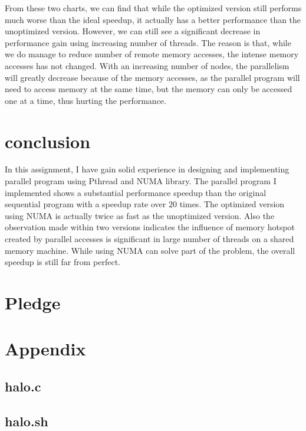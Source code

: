 \documentclass{cs4444}
\begin{document}
From these two charts, we can find that while the optimized version still performs much worse than the ideal speedup, it actually has a better performance than the unoptimized version. However, we can still see a significant decrease in performance gain using increasing number of threads. The reason is that, while we do manage to reduce number of remote memory accesses, the intense memory accesses has not changed. With an increasing number of nodes, the parallelism will greatly decrease because of the memory accesses, as the parallel program will need to access memory at the same time, but the memory can only be accessed one at a time, thus hurting the performance.

\section{conclusion}
In this assignment, I have gain solid experience in designing and implementing parallel program using Pthread and NUMA library. The parallel program I implemented shows a substantial performance speedup than the original sequential program with a speedup rate over $20$ times. The optimized version using NUMA is actually twice as fast as the unoptimized version. Also the observation made within two versions indicates the influence of memory hotspot created by parallel accesses is significant in large number of threads on a shared memory machine. While using NUMA can solve part of the problem, the overall speedup is still far from perfect.  
\section{Pledge}

\pledge
\newpage
\section{Appendix}
\subsection{halo.c}

\subsection{halo.sh}

\end{document}
